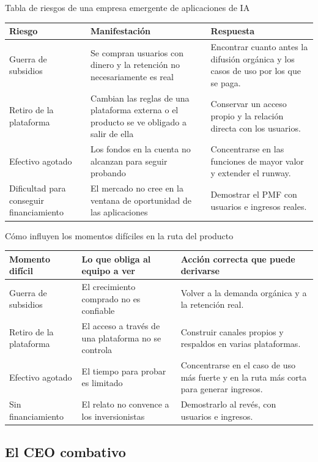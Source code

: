 \documentclass[a4paper]{article}
\begin{document}
\begin{knowledgebox}{Tabla de riesgos de una empresa emergente de aplicaciones de IA}
\begin{tabularx}{\textwidth}{p{}p{}X}
\toprule
Riesgo & Manifestación & Respuesta \\
\midrule
Guerra de subsidios & Se compran usuarios con dinero y la retención no necesariamente es real & Encontrar cuanto antes la difusión orgánica y los casos de uso por los que se paga. \\
Retiro de la plataforma & Cambian las reglas de una plataforma externa o el producto se ve obligado a salir de ella & Conservar un acceso propio y la relación directa con los usuarios. \\
Efectivo agotado & Los fondos en la cuenta no alcanzan para seguir probando & Concentrarse en las funciones de mayor valor y extender el runway. \\
Dificultad para conseguir financiamiento & El mercado no cree en la ventana de oportunidad de las aplicaciones & Demostrar el PMF con usuarios e ingresos reales. \\
\bottomrule
\end{tabularx}
\end{knowledgebox}

\begin{knowledgebox}{Cómo influyen los momentos difíciles en la ruta del producto}
\begin{tabularx}{\textwidth}{p{}p{}X}
\toprule
Momento difícil & Lo que obliga al equipo a ver & Acción correcta que puede derivarse \\
\midrule
Guerra de subsidios & El crecimiento comprado no es confiable & Volver a la demanda orgánica y a la retención real. \\
Retiro de la plataforma & El acceso a través de una plataforma no se controla & Construir canales propios y respaldos en varias plataformas. \\
Efectivo agotado & El tiempo para probar es limitado & Concentrarse en el caso de uso más fuerte y en la ruta más corta para generar ingresos. \\
Sin financiamiento & El relato no convence a los inversionistas & Demostrarlo al revés, con usuarios e ingresos. \\
\bottomrule
\end{tabularx}
\end{knowledgebox}

\subsection{El CEO combativo}
\end{document}
